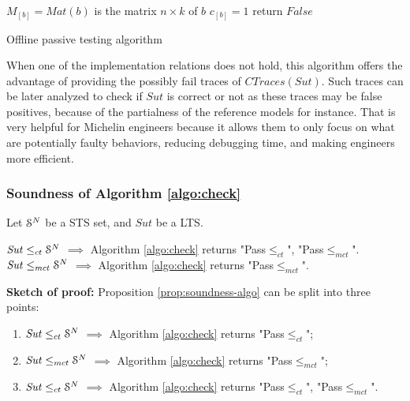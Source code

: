 \begin{algorithm}[h]
{{                $M_{[b]} = Mat(b)$ is the matrix $n \times k$ of $b$\;
                $c_{[b]} = 1$\;
        }
        return $False$\;
    }

    \caption{Offline passive testing algorithm}
    \label{algo:check}
\end{algorithm}

When one of the implementation relations does not hold, this
algorithm offers the advantage of providing the possibly fail
traces of $CTraces({Sut})$. Such traces can be later analyzed to
check if $\mathit{Sut}$ is correct or not as these traces may be
false positives, because of the partialness of the reference
models for instance. That is very helpful for Michelin engineers
because it allows them to only focus on what are potentially
faulty behaviors, reducing debugging time, and making engineers
more efficient.

\subsubsection{Soundness of Algorithm \ref{algo:check}}

\begin{proposition}
    Let $\EuScript{S}^{N}$ be a STS set, and $\mathit{Sut}$ be a LTS.

    $\mathit{Sut} \leq_{ct} \EuScript{S}^N$ $\implies$
    Algorithm \ref{algo:check} returns "Pass$\leq_{ct}$",
    "Pass$\leq_{mct}$".\\
    $\mathit{Sut} \leq_{mct} \EuScript{S}^N$ $\implies$
    Algorithm \ref{algo:check} returns "Pass$\leq_{mct}$".

    \label{prop:soundness-algo}
\end{proposition}

\textbf{Sketch of proof:} Proposition \ref{prop:soundness-algo}
can be split into three points:

\begin{enumerate}
    \item $\mathit{Sut} \leq_{ct} \EuScript{S}^N$ $\implies$
        Algorithm \ref{algo:check} returns "Pass$\leq_{ct}$";

    \item $\mathit{Sut} \leq_{mct} \EuScript{S}^N$ $\implies$
        Algorithm \ref{algo:check} returns "Pass$\leq_{mct}$";

    \item $\mathit{Sut} \leq_{ct} \EuScript{S}^N$ $\implies$
        Algorithm \ref{algo:check} returns "Pass$\leq_{ct}$",
        "Pass$\leq_{mct}$".
\end{enumerate}

